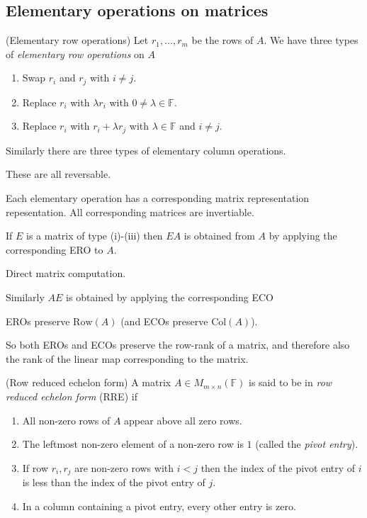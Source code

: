 \documentclass{article}
\newcommand{\F}{\mathbb{F}}
\newcommand{\Col}{\mathrm{Col}}
\newcommand{\Row}{\mathrm{Row}}
\begin{document}
\subsection{Elementary operations on matrices}
\begin{definition}
(Elementary row operations)
Let $ r_1,\dots, r_m $ be the rows of $ A $. We have three types of \textit{elementary row operations} on $ A $
\begin{enumerate}
	\item Swap $ r_i $ and $ r_j $ with $ i\ne j $.
	\item Replace $ r_i $ with $ \lambda r_i $ with $ 0\ne\lambda\in\F $.
	\item Replace $ r_i $ with $ r_i+\lambda r_j $ with $ \lambda\in \F $ and $ i\ne j $.
\end{enumerate}
\end{definition}
Similarly there are three types of elementary column operations.
\begin{remark}
  These are all reversable.
\end{remark}
Each elementary operation has a corresponding matrix representation repesentation. All corresponding matrices are invertiable.
\begin{lemma}
  If $ E $ is a matrix of type (i)-(iii) then $ EA $ is obtained from $ A $ by applying the corresponding ERO to $ A $.
\end{lemma}
\pf Direct matrix computation.
\begin{remark}
  Similarly $ AE $ is obtained by applying the corresponding ECO
\end{remark}
\begin{remark}
  EROs preserve $ \Row(A) $ (and ECOs preserve $ \Col(A) $).
\end{remark}
So both EROs and ECOs preserve the row-rank of a matrix, and therefore also the rank of the linear map corresponding to the matrix.
\begin{definition}
	(Row reduced echelon form) A matrix $ A\in M_{m\times n}(\F) $ is said to be in \textit{row reduced echelon form} (RRE) if
	\begin{enumerate}
		\item All non-zero rows of $ A $ appear above all zero rows.
		\item The leftmost non-zero element of a non-zero row is $ 1 $ (called the \textit{pivot entry}).
		\item If row $ r_i,r_j $ are non-zero rows with $ i<j $ then the index of the pivot entry of $ i $ is less than the index of the pivot entry of $ j $.
		\item In a column containing a pivot entry, every other entry is zero.
	\end{enumerate}
\end{definition}
\end{document}
